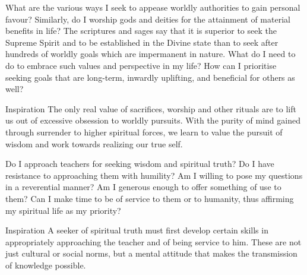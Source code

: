 


\newpage
\begin{mananam}{} 
\mananamtext What are the various ways I seek to appease worldly authorities to gain personal favour? Similarly, do I worship gods and deities for the attainment of material benefits in life? The scriptures and sages say that it is superior to seek the Supreme Spirit and to be established in the Divine state than to seek after hundreds of worldly goals which are impermanent in nature. What do I need to do to embrace such values and perspective in my life? How can I prioritise seeking goals that are long-term, inwardly uplifting, and beneficial for others as well?
\end{mananam}
\WritingHand{}
\begin{inspiration}{\mananamfont Inspiration}
\mananamtext The only real value of sacrifices, worship and other rituals are to lift us out of excessive obsession to worldly pursuits. With the purity of mind gained through surrender to higher spiritual forces, we learn to value the pursuit of wisdom and work towards realizing our true self.  
\end{inspiration}
\newpage


\newpage
\begin{mananam}{} 
\mananamtext Do I approach teachers for seeking wisdom and spiritual truth? Do I have resistance to approaching them with humility? Am I willing to pose my questions in a reverential manner? Am I generous enough to offer something of use to them? Can I make time to be of service to them or to humanity, thus affirming my spiritual life as my priority?
\end{mananam}
\WritingHand{}
\begin{inspiration}{\mananamfont Inspiration}
\mananamtext A seeker of spiritual truth must first develop certain skills in appropriately approaching the teacher and of being service to him. These are not just cultural or social norms, but a mental attitude that makes the transmission of knowledge possible.  
\end{inspiration}
\newpage

